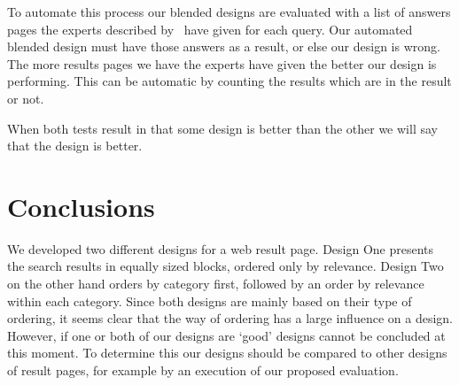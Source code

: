 \documentclass[12pt]{article}
\begin{document}
To automate this process our blended designs are evaluated with a list of answers pages the experts described by~\cite{lalmas2011aggregated} have given for each query. Our automated blended design must have those answers as a result, or else our design is wrong. The more results pages we have the experts have given the better our design is performing. This can be automatic by counting the results which are in the result or not. 

When both tests result in that some design is better than the other we will say that the design is better. %

\section{Conclusions}
\label{sec:conclusion}
We developed two different designs for a web result page.
Design One presents the search results in equally sized blocks, ordered only by relevance.
Design Two on the other hand orders by category first, followed by an order by relevance within each category.
Since both designs are mainly based on their type of ordering, it seems clear that the way of ordering has a large influence on a design.
However, if one or both of our designs are `good' designs cannot be concluded at this moment.
To determine this our designs should be compared to other designs of result pages, for example by an execution of our proposed evaluation.





\appendix

\end{document}
